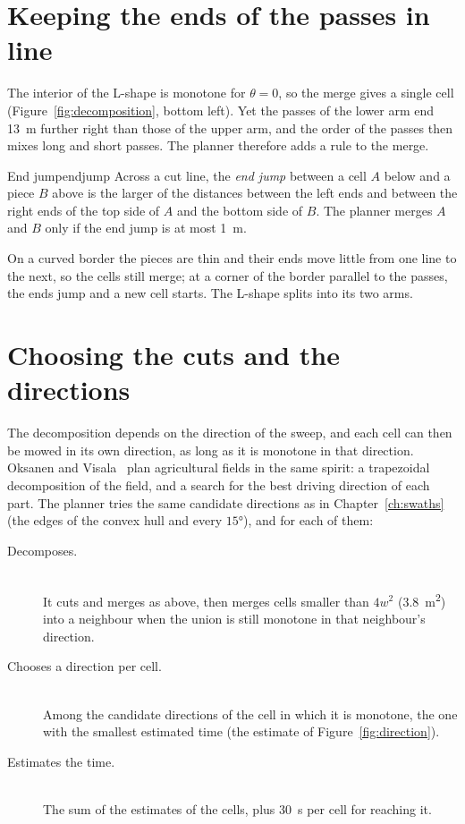 \section{Keeping the ends of the passes in line}

The interior of the L-shape is monotone for $\theta = 0$, so the merge
gives a single cell (Figure~\ref{fig:decomposition}, bottom left). Yet the
passes of the lower arm end \SI{13}{\metre} further right than those of
the upper arm, and the order of the passes then mixes long and short
passes. The planner therefore adds a rule to the merge.

\begin{definition}{End jump}{endjump}
  Across a cut line, the \emph{end jump} between a cell $A$ below and a
  piece $B$ above is the larger of the distances between the left ends and
  between the right ends of the top side of $A$ and the bottom side of $B$.
  The planner merges $A$ and $B$ only if the end jump is at most
  \SI{1}{\metre}.
\end{definition}

On a curved border the pieces are thin and their ends move little from one
line to the next, so the cells still merge; at a corner of the border
parallel to the passes, the ends jump and a new cell starts. The L-shape
splits into its two arms.

\section{Choosing the cuts and the directions}

The decomposition depends on the direction of the sweep, and each cell can
then be mowed in its own direction, as long as it is monotone in that
direction. Oksanen and Visala~\cite{oksanen2009coverage} plan agricultural
fields in the same spirit: a trapezoidal decomposition of the field, and a
search for the best driving direction of each part. The planner tries the
same candidate directions as in Chapter~\ref{ch:swaths} (the edges of the
convex hull and every $15°$), and for each of them:

\begin{description}
  \item[Decomposes.]
    \leavevmode\\
    It cuts and merges as above, then merges cells smaller than $4w^2$
    (\SI{3.8}{\metre\squared}) into a neighbour when the union is still
    monotone in that neighbour's direction.
  \item[Chooses a direction per cell.]
    \leavevmode\\
    Among the candidate directions of the cell in which it is monotone, the
    one with the smallest estimated time (the estimate of
    Figure~\ref{fig:direction}).
  \item[Estimates the time.]
    \leavevmode\\
    The sum of the estimates of the cells, plus \SI{30}{\second} per cell
    for reaching it.
\end{description}

